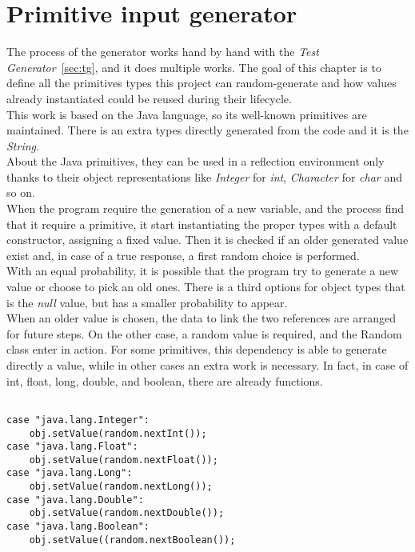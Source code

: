 \section{Primitive input generator}\label{sec:pig}
The process of the generator works hand by hand with the \emph{Test Generator}~\ref{sec:tg}, and it does multiple works.
The goal of this chapter is to define all the primitives types this project can random-generate and how values already instantiated could be reused during their lifecycle.\\
This work is based on the Java language, so its well-known primitives are maintained.
There is an extra types  directly generated from the code and it is the \emph{String}.\\
About the Java primitives, they can be used in a reflection environment only thanks to their object representations like \emph{Integer} for \emph{int}, \emph{Character} for \emph{char} and so on.\\
When the program require the generation of a new variable, and the process find that it require a primitive, it start instantiating the proper types with a default constructor, assigning a fixed value.
Then it is checked if an older generated value exist and, in case of a true response, a first random choice is performed.\\
With an equal probability, it is possible that the program try to generate a new value or choose to pick an old ones.
There is a third options for object types that is the \emph{null} value, but has a smaller probability to appear.\\
When an older value is chosen, the data to link the two references are arranged for future steps.
On the other case, a random value is required, and the Random~\cite{rand} class enter in action.
For some primitives, this dependency is able to generate directly a value, while in other cases an extra work is necessary.
In fact, in case of int, float, long, double, and boolean, there are already functions.
\begin{lstlisting}[caption={Random default generator},label={lst:genDef}]% Start your code-block

case "java.lang.Integer":
	obj.setValue(random.nextInt());
case "java.lang.Float":
	obj.setValue(random.nextFloat());
case "java.lang.Long":
	obj.setValue(random.nextLong());
case "java.lang.Double":
	obj.setValue(random.nextDouble());
case "java.lang.Boolean":
	obj.setValue((random.nextBoolean());
\end{lstlisting}
